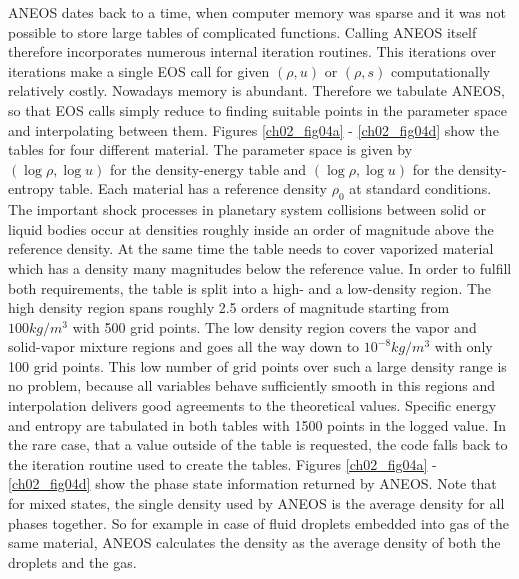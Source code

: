ANEOS dates back to a time, when computer memory was sparse and it was not possible to store large tables of complicated functions. Calling ANEOS itself therefore incorporates numerous internal iteration routines. This iterations over iterations make a single EOS call for given $(\rho, u)$ or $(\rho, s)$ computationally relatively costly. Nowadays memory is abundant. Therefore we tabulate ANEOS, so that EOS calls simply reduce to finding suitable points in the parameter space and interpolating between them. Figures \ref{ch02_fig04a} - \ref{ch02_fig04d} show the tables for four different material. The parameter space is given by $(\log \rho, \log u)$ for the density-energy table and $(\log \rho, \log u)$ for the density-entropy table. Each material has a reference density $\rho_0$ at standard conditions. The important shock processes in planetary system collisions between solid or liquid bodies occur at densities roughly inside an order of magnitude above the reference density. At the same time the table needs to cover vaporized material which has a density many magnitudes below the reference value. In order to fulfill both requirements, the table is split into a high- and a low-density region. The high density region spans roughly 2.5 orders of magnitude starting from $100kg/m^3$ with 500 grid points. The low density  region covers the vapor and solid-vapor mixture regions and goes all the way down to $10^{-8}kg/m^3$ with only 100 grid points. This low number of grid points over such a large density range is no problem, because all variables behave sufficiently smooth in this regions and interpolation delivers good agreements to the theoretical values. Specific energy and entropy are tabulated in both tables with 1500 points in the logged value. In the rare case, that a value outside of the table is requested, the code falls back to the iteration routine used to create the tables. Figures \ref{ch02_fig04a} - \ref{ch02_fig04d} show the phase state information returned by ANEOS. Note that for mixed states, the single density used by ANEOS is the average density for all phases together. So for example in case of fluid droplets embedded into gas of the same material, ANEOS calculates the density as the average density of both the droplets and the gas.

